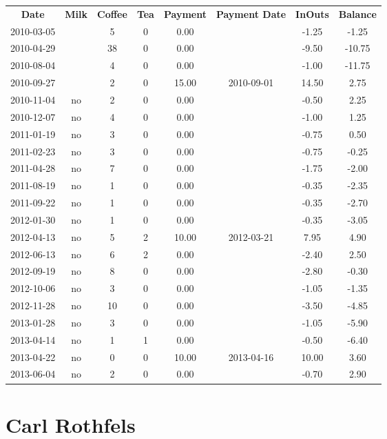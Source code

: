 \begin{center}
\begin{tabular}{cccccccc}
\textbf{Date} & \textbf{Milk} & \textbf{Coffee} & \textbf{Tea} & \textbf{Payment} & \textbf{Payment Date} & \textbf{InOuts} & \textbf{Balance} \\
2010-03-05 &  &  5 & 0 &  0.00 &  & -1.25 &  -1.25\\ 
2010-04-29 &  & 38 & 0 &  0.00 &  & -9.50 & -10.75\\ 
2010-08-04 &  &  4 & 0 &  0.00 &  & -1.00 & -11.75\\ 
2010-09-27 &  &  2 & 0 & 15.00 & 2010-09-01 & 14.50 &   2.75\\ 
2010-11-04 & no &  2 & 0 &  0.00 &  & -0.50 &   2.25\\ 
2010-12-07 & no &  4 & 0 &  0.00 &  & -1.00 &   1.25\\ 
2011-01-19 & no &  3 & 0 &  0.00 &  & -0.75 &   0.50\\ 
2011-02-23 & no &  3 & 0 &  0.00 &  & -0.75 &  -0.25\\ 
2011-04-28 & no &  7 & 0 &  0.00 &  & -1.75 &  -2.00\\ 
2011-08-19 & no &  1 & 0 &  0.00 &  & -0.35 &  -2.35\\ 
2011-09-22 & no &  1 & 0 &  0.00 &  & -0.35 &  -2.70\\ 
2012-01-30 & no &  1 & 0 &  0.00 &  & -0.35 &  -3.05\\ 
2012-04-13 & no &  5 & 2 & 10.00 & 2012-03-21 &  7.95 &   4.90\\ 
2012-06-13 & no &  6 & 2 &  0.00 &  & -2.40 &   2.50\\ 
2012-09-19 & no &  8 & 0 &  0.00 &  & -2.80 &  -0.30\\ 
2012-10-06 & no &  3 & 0 &  0.00 &  & -1.05 &  -1.35\\ 
2012-11-28 & no & 10 & 0 &  0.00 &  & -3.50 &  -4.85\\ 
2013-01-28 & no &  3 & 0 &  0.00 &  & -1.05 &  -5.90\\ 
2013-04-14 & no &  1 & 1 &  0.00 &  & -0.50 &  -6.40\\ 
2013-04-22 & no &  0 & 0 & 10.00 & 2013-04-16 & 10.00 &   3.60\\ 
2013-06-04 & no &  2 & 0 &  0.00 &  & -0.70 &   2.90
\end{tabular}
\end{center}

\section{Carl Rothfels}

